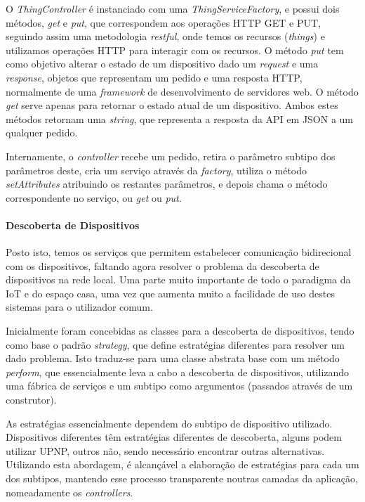 O \textit{ThingController} é instanciado com uma \textit{ThingServiceFactory}, e possui dois métodos, \textit{get} e \textit{put}, que correspondem aos operações HTTP GET e PUT, seguindo assim uma metodologia \textit{restful}, onde temos os recursos (\textit{things}) e utilizamos operações HTTP para interagir com os recursos. O método \textit{put} tem como objetivo alterar o estado de um dispositivo dado um \textit{request} e uma \textit{response}, objetos que representam um pedido e uma resposta HTTP, normalmente de uma \textit{framework} de desenvolvimento de servidores web. O método \textit{get} serve apenas para retornar o estado atual de um dispositivo. Ambos estes métodos retornam uma \textit{string}, que representa a resposta da API em JSON a um qualquer pedido.

Internamente, o \textit{controller} recebe um pedido, retira o parâmetro subtipo dos parâmetros deste, cria um serviço através da \textit{factory}, utiliza o método \textit{setAttributes} atribuindo os restantes parâmetros, e depois chama o método correspondente no serviço, ou \textit{get} ou \textit{put}.

\newpage

%
%
%
%

\paragraph*{Descoberta de Dispositivos}

Posto isto, temos os serviços que permitem estabelecer comunicação bidirecional com os dispositivos, faltando agora resolver o problema da descoberta de dispositivos na rede local. Uma parte muito importante de todo o paradigma da IoT e do espaço casa, uma vez que aumenta muito a facilidade de uso destes sistemas para o utilizador comum.

Inicialmente foram concebidas as classes para a descoberta de dispositivos, tendo como base o padrão \textit{strategy}, que define estratégias diferentes para resolver um dado problema. Isto traduz-se para uma classe abstrata base com um método \textit{perform}, que essencialmente leva a cabo a descoberta de dispositivos, utilizando uma fábrica de serviços e um subtipo como argumentos (passados através de um construtor).

As estratégias essencialmente dependem do subtipo de dispositivo utilizado. Dispositivos diferentes têm estratégias diferentes de descoberta, alguns podem utilizar UPNP, outros não, sendo necessário encontrar outras alternativas. Utilizando esta abordagem, é alcançável a elaboração de estratégias para cada um dos subtipos, mantendo esse processo transparente noutras camadas da aplicação, nomeadamente os \textit{controllers}.

